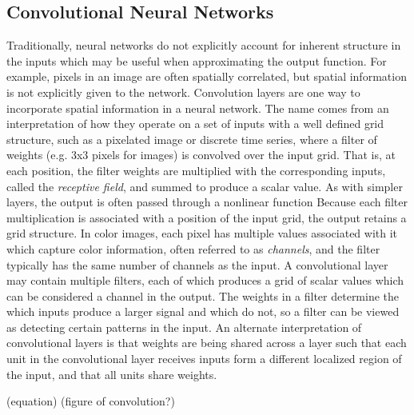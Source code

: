 
\subsection{Convolutional Neural Networks}

Traditionally, neural networks do not explicitly account for inherent structure in the inputs which may be useful when approximating the output function.
For example, pixels in an image are often spatially correlated, but spatial information is not explicitly given to the network.
Convolution layers are one way to incorporate spatial information in a neural network. 
The name comes from an interpretation of how they operate on a set of inputs with a well defined grid structure, such as a pixelated image or discrete time series, where a filter of weights (e.g. 3x3 pixels for images) is convolved over the input grid.
That is, at each position, the filter weights are multiplied with the corresponding inputs, called the \textit{receptive field}, and summed to produce a scalar value.
As with simpler layers, the output is often passed through a nonlinear function
Because each filter multiplication is associated with a position of the input grid, the output retains a grid structure. 
In color images, each pixel has multiple values associated with it which capture color information, often referred to as \textit{channels}, and the filter typically has the same number of channels as the input. 
A convolutional layer may contain multiple filters, each of which produces a grid of scalar values which can be considered a channel in the output.
The weights in a filter determine the which inputs produce a larger signal and which do not, so a filter can be viewed as detecting certain patterns in the input.
An alternate interpretation of convolutional layers is that weights are being shared across a layer such that each unit in the convolutional layer receives inputs form a different localized region of the input, and that all units share weights. 

(equation)
(figure of convolution?)


